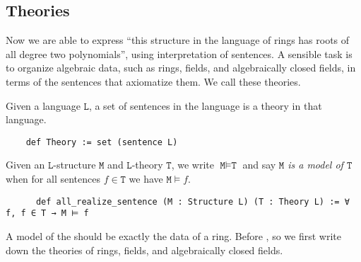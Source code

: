 \subsection{Theories}

Now we are able to express ``this structure in the language of rings has roots
of all degree two polynomials'', using interpretation of sentences.
A sensible task is to organize algebraic data, such as rings, fields,
and algebraically closed fields, in terms of the sentences that axiomatize them.
We call these theories.

\begin{dfn}[Theory]
  Given a language $\texttt{L}$,
  a set of sentences in the language is a theory in that language.
  \begin{lstlisting}
    def Theory := set (sentence L)   \end{lstlisting}
\end{dfn}

\begin{dfn}[Models]
    Given an $\texttt{L}$-structure $\texttt{M}$ and $\texttt{L}$-theory $\texttt{T}$,
    we write $\texttt{M} \vDash \texttt{T}$ and say
    \emph{$\texttt{M}$ is a model of $\texttt{T}$} when
    for all sentences $f \in \texttt{T}$ we have $\texttt{M} \vDash f$.

    \begin{lstlisting}
      def all_realize_sentence (M : Structure L) (T : Theory L) := ∀ f, f ∈ T → M ⊨ f \end{lstlisting}
  \end{dfn}

A model of the  should be exactly the data of a ring.
Before , so we first write down the theories of
rings, fields, and algebraically closed fields.

